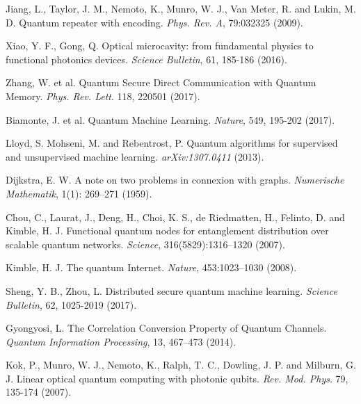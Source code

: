 \documentclass[11pt]{article}%
\begin{document}
\begin{enumerate}[ {[}1{]} ]
\item \label{ref19} Jiang, L., Taylor, J. M., Nemoto, K., Munro, W. J., Van Meter, R. and Lukin, M. D. Quantum repeater with encoding. \textit{Phys. Rev. A}, 79:032325 (2009).

\item \label{ref20} Xiao, Y. F., Gong, Q. Optical microcavity: from fundamental physics to functional photonics devices. \textit{Science Bulletin}, 61, 185-186 (2016).

\item \label{ref21} Zhang, W. et al. Quantum Secure Direct Communication with Quantum Memory. \textit{Phys. Rev. Lett}. 118, 220501 (2017).

\item \label{ref22} Biamonte, J. et al. Quantum Machine Learning. \textit{Nature}, 549, 195-202 (2017). 

\item \label{ref23} Lloyd, S. Mohseni, M. and Rebentrost, P. Quantum algorithms for supervised and unsupervised machine learning. \textit{arXiv:1307.0411} (2013).

\item \label{ref24} Dijkstra, E. W. A note on two problems in connexion with graphs. \textit{Numerische Mathematik}, 1(1): 269--271 (1959).

\item \label{ref25} Chou, C., Laurat, J., Deng, H., Choi, K. S., de Riedmatten, H., Felinto, D. and Kimble, H. J. Functional quantum nodes for entanglement distribution over scalable quantum networks. \textit{Science}, 316(5829):1316--1320 (2007).

\item \label{ref26} Kimble, H. J. The quantum Internet. \textit{Nature}, 453:1023--1030 (2008).

\item \label{ref27} Sheng, Y. B., Zhou, L. Distributed secure quantum machine learning. \textit{Science Bulletin}, 62, 1025-2019 (2017). 

\item \label{ref28} Gyongyosi, L. The Correlation Conversion Property of Quantum Channels. \textit{Quantum Information Processing}, 13, 467--473 (2014).

\item \label{ref29} Kok, P., Munro, W. J., Nemoto, K., Ralph, T. C., Dowling, J. P. and Milburn, G. J. Linear optical quantum computing with photonic qubits. \textit{Rev. Mod. Phys}. 79, 135-174 (2007).


\end{enumerate}
\end{document}
